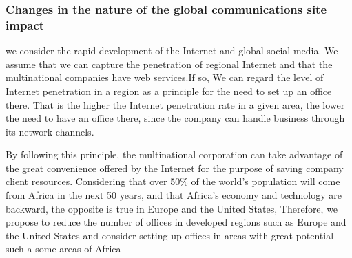\subsubsection{Changes in the nature of the global communications site impact} 
\noindent we consider the rapid development of the Internet and global social media. We assume that we can capture the penetration of regional Internet and that the multinational companies have web services.If so, We can regard the level of Internet penetration in a region as a principle for the need to set up an office there. That is the higher the Internet penetration rate in a given area, the lower the need to have an office there, since the company can handle business through its network channels.
\par By following this principle, the multinational corporation can take advantage of the great convenience offered by the Internet for the purpose of saving company client resources. Considering that over 50\% of the world's population will come from Africa in the next 50 years, and that Africa's economy and technology are backward, the opposite is true in Europe and the United States, Therefore, we propose to reduce the number of offices in developed regions such as Europe and the United States and consider setting up offices in areas with great potential such a some areas of Africa

 

